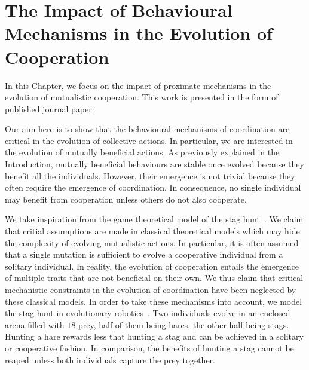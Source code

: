 \chapter{The Impact of Behavioural Mechanisms in the Evolution of Cooperation}
\label{chapter:C1_article1}

\setcounter{secnumdepth}{0}
\setcounter{minitocdepth}{1}
\minitoc[n] %

In this Chapter, we focus on the impact of proximate mechanisms in the evolution of mutualistic cooperation. This work is presented in the form of published journal paper:

\begin{quote}
\end{quote}

Our aim here is to show that the behavioural mechanisms of coordination are critical in the evolution of collective actions. In particular, we are interested in the evolution of mutually beneficial actions. As previously explained in the Introduction, mutually beneficial behaviours are stable once evolved because they benefit all the individuals. However, their emergence is not trivial because they often require the emergence of coordination. In consequence, no single individual may benefit from cooperation unless others do not also cooperate.

We take inspiration from the game theoretical model of the stag hunt~\parencite{Skyrms2004}. We claim that critial assumptions are made in classical theoretical models which may hide the complexity of evolving mutualistic actions. In particular, it is often assumed that a single mutation is sufficient to evolve a cooperative individual from a solitary individual. In reality, the evolution of cooperation entails the emergence of multiple traits that are not beneficial on their own. We thus claim that critical mechanistic constraints in the evolution of coordination have been neglected by these classical models. In order to take these mechanisms into account, we model the stag hunt in evolutionary robotics~\parencite{Nolfi2000, Doncieux2015a}. Two individuals evolve in an enclosed arena filled with $18$ prey, half of them being hares, the other half being stags. Hunting a hare rewards less that hunting a stag and can be achieved in a solitary or cooperative fashion. In comparison, the benefits of hunting a stag cannot be reaped unless both individuals capture the prey together.

